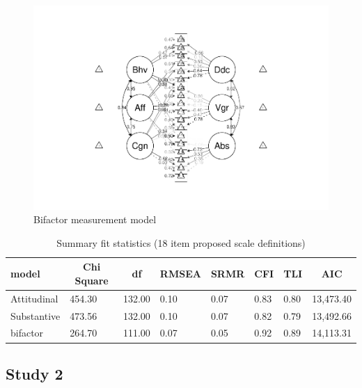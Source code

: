 \documentclass[
  english,
  man]{apa6}
\begin{document}
\begin{figure}
\centering
\includegraphics{SIOPpapaja_files/figure-latex/CFAatt3-1.pdf}
\caption{\label{fig:CFAatt3}Bifactor measurement model}
\end{figure}

\begin{table}[tbp]

\begin{center}
\begin{threeparttable}

\caption{\label{tab:fitmeasures}Summary fit statistics (18 item proposed scale definitions)}

\begin{tabular}{llllllll}
\toprule
model & \multicolumn{1}{c}{Chi Square} & \multicolumn{1}{c}{df} & \multicolumn{1}{c}{RMSEA} & \multicolumn{1}{c}{SRMR} & \multicolumn{1}{c}{CFI} & \multicolumn{1}{c}{TLI} & \multicolumn{1}{c}{AIC}\\
\midrule
Attitudinal & 454.30 & 132.00 & 0.10 & 0.07 & 0.83 & 0.80 & 13,473.40\\
Substantive & 473.56 & 132.00 & 0.10 & 0.07 & 0.82 & 0.79 & 13,492.66\\
bifactor & 264.70 & 111.00 & 0.07 & 0.05 & 0.92 & 0.89 & 14,113.31\\
\bottomrule
\end{tabular}

\end{threeparttable}
\end{center}

\end{table}

\hypertarget{study-2}{%
\subsection{Study 2}\label{study-2}}
\end{document}
